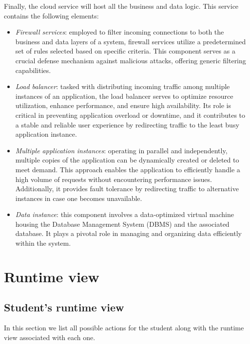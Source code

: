 \documentclass[12pt, a4paper]{report}
\begin{document}
    Finally, the cloud service will host all the business and data logic. 
    This service contains the following elements: 
    \begin{itemize}
        \item \textit{Firewall services}: employed to filter incoming connections to both the business and data layers of a system, firewall services utilize a predetermined set of rules selected based on specific criteria. 
            This component serves as a crucial defense mechanism against malicious attacks, offering generic filtering capabilities.
        \item \textit{Load balancer}: tasked with distributing incoming traffic among multiple instances of an application, the load balancer serves to optimize resource utilization, enhance performance, and ensure high availability. 
            Its role is critical in preventing application overload or downtime, and it contributes to a stable and reliable user experience by redirecting traffic to the least busy application instance.
        \item \textit{Multiple application instances}: operating in parallel and independently, multiple copies of the application can be dynamically created or deleted to meet demand. 
            This approach enables the application to efficiently handle a high volume of requests without encountering performance issues. 
            Additionally, it provides fault tolerance by redirecting traffic to alternative instances in case one becomes unavailable.
        \item \textit{Data instance}: this component involves a data-optimized virtual machine housing the Database Management System (DBMS) and the associated database. 
            It plays a pivotal role in managing and organizing data efficiently within the system.
    \end{itemize}

    \section{Runtime view}
    \subsection{Student's runtime view}
    In this section we list all possible actions for the student along with the runtime view associated with each one. 
    
\end{document}

